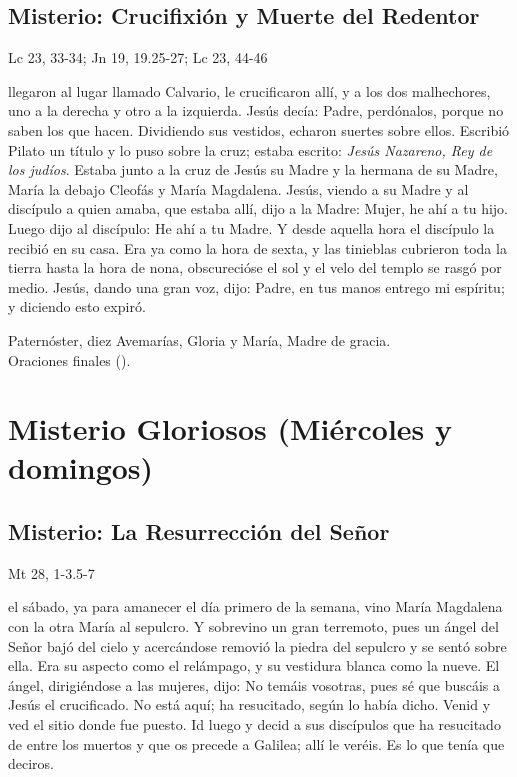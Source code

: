\documentclass[10pt,a4paper,oneside]{book}
\newcounter{sorrowful-counter}
\newcounter{glorious-counter}
\begin{document}
\subsection*{ Misterio: Crucifixión y Muerte del Redentor}
\begin{flushright}
      {\color{red}Lc 23, 33-34; Jn 19, 19.25-27; Lc 23, 44-46}
\end{flushright}
 llegaron al lugar llamado Calvario, le crucificaron allí, y a los dos malhechores, uno a la derecha y otro a la izquierda. Jesús decía:
Padre, perdónalos, porque no saben los que hacen. Dividiendo sus vestidos, echaron suertes sobre ellos. Escribió Pilato un título y lo puso sobre la cruz;
estaba escrito: \textit{Jesús Nazareno, Rey de los judíos}. Estaba junto a la cruz de Jesús su Madre y la hermana de su Madre, María la debajo Cleofás y María Magdalena.
Jesús, viendo a su Madre y al discípulo a quien amaba, que estaba allí, dijo a la Madre: Mujer, he ahí a tu hijo. Luego dijo al discípulo: He ahí a tu Madre.
Y desde aquella hora el discípulo la recibió en su casa. Era ya como la hora de sexta, y las tinieblas cubrieron toda la tierra hasta la hora de nona,
obscurecióse el sol y el velo del templo se rasgó por medio. Jesús, dando una gran voz, dijo: Padre, en tus manos entrego mi espíritu; y diciendo esto expiró.

\begin{center}
      Paternóster, diez Avemarías, Gloria y María, Madre de gracia.\\
      Oraciones finales ().
\end{center}

\section*{Misterio Gloriosos (Miércoles y domingos)}
\subsection*{ Misterio: La Resurrección del Señor}
\begin{flushright}
      {\color{red}Mt 28, 1-3.5-7}
\end{flushright}
 el sábado, ya para amanecer el día primero de la semana, vino María Magdalena con la otra María al sepulcro. Y sobrevino un gran terremoto,
pues un ángel del Señor bajó del cielo y acercándose removió la piedra del sepulcro y se sentó sobre ella. Era su aspecto como el relámpago, y su vestidura blanca como la nueve.
El ángel, dirigiéndose a las mujeres, dijo: No temáis vosotras, pues sé que buscáis a Jesús el crucificado. No está aquí; ha resucitado, según lo había dicho.
Venid y ved el sitio donde fue puesto. Id luego y decid a sus discípulos que ha resucitado de entre los muertos y que os precede a Galilea; allí le veréis.
Es lo que tenía que deciros.
\end{document}

